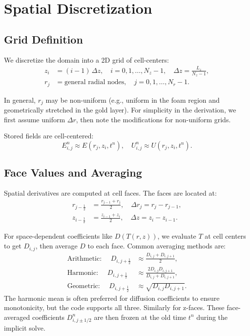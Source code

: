 \documentclass[12pt,oneside]{article}
\begin{document}
\section{Spatial Discretization}

\subsection{Grid Definition}

We discretize the domain into a 2D grid of cell-centers:
\begin{align}
z_i &= (i-1)\,\Delta z, \quad i = 0, 1, \ldots, N_z - 1, \quad \Delta z = \frac{L_z}{N_z - 1},\\
r_j &= \text{general radial nodes}, \quad j = 0, 1, \ldots, N_r - 1.
\end{align}

In general, $r_j$ may be non-uniform (e.g., uniform in the foam region and geometrically stretched in the gold layer). For simplicity in the derivation, we first assume uniform $\Delta r$, then note the modifications for non-uniform grids.

Stored fields are cell-centered:
\begin{equation}
E^{n}_{i,j} \approx E(r_j, z_i, t^n), \quad U^{n}_{i,j} \approx U(r_j, z_i, t^n).
\end{equation}

\subsection{Face Values and Averaging}

Spatial derivatives are computed at cell faces. The faces are located at:
\begin{align}
r_{j-\frac12} &= \frac{r_{j-1} + r_j}{2}, \quad \Delta r_j = r_j - r_{j-1},\\
z_{i-\frac12} &= \frac{z_{i-1} + z_i}{2}, \quad \Delta z = z_i - z_{i-1}.
\end{align}

For space-dependent coefficients like $D(T(r,z))$, we evaluate $T$ at cell centers to get $D_{i,j}$, then average $D$ to each face. Common averaging methods are:
\begin{align}
\text{Arithmetic: } \quad D_{i,j+\frac12} &\approx \frac{D_{i,j} + D_{i,j+1}}{2},\\
\text{Harmonic: } \quad D_{i,j+\frac12} &\approx \frac{2 D_{i,j} D_{i,j+1}}{D_{i,j} + D_{i,j+1}},\\
\text{Geometric: } \quad D_{i,j+\frac12} &\approx \sqrt{D_{i,j} D_{i,j+1}}.
\end{align}
The harmonic mean is often preferred for diffusion coefficients to ensure monotonicity, but the code supports all three. Similarly for z-faces. These face-averaged coefficients $D^n_{i,j\pm1/2}$ are then frozen at the old time $t^n$ during the implicit solve.
\end{document}
